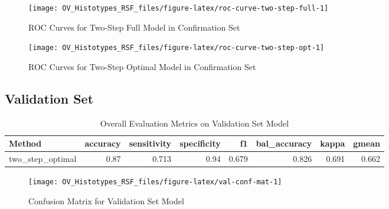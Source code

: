 \documentclass[
]{report}
\begin{document}
\begin{figure}[H]

{\centering \texttt{[image: OV\_Histotypes\_RSF\_files/figure-latex/roc-curve-two-step-full-1]} 

}

\caption{ROC Curves for Two-Step Full Model in Confirmation Set}\label{fig:roc-curve-two-step-full}
\end{figure}

\begin{figure}[H]

{\centering \texttt{[image: OV\_Histotypes\_RSF\_files/figure-latex/roc-curve-two-step-opt-1]} 

}

\caption{ROC Curves for Two-Step Optimal Model in Confirmation Set}\label{fig:roc-curve-two-step-opt}
\end{figure}

\subsection{Validation Set}\label{validation-set}

\begin{table}

\caption{\label{tab:val-eval-overall}Overall Evaluation Metrics on Validation Set Model}
\centering
\begin{tabular}[t]{l|r|r|r|r|r|r|r}
\hline
Method & accuracy & sensitivity & specificity & f1 & bal\_accuracy & kappa & gmean\\
\hline
two\_step\_optimal & 0.87 & 0.713 & 0.94 & 0.679 & 0.826 & 0.691 & 0.662\\
\hline
\end{tabular}
\end{table}

\begin{figure}[H]

{\centering \texttt{[image: OV\_Histotypes\_RSF\_files/figure-latex/val-conf-mat-1]} 

}

\caption{Confusion Matrix for Validation Set Model}\label{fig:val-conf-mat}
\end{figure}
\end{document}
